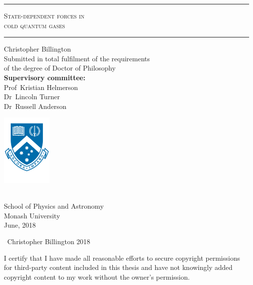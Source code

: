 \begin{titlingpage}
\thispagestyle{empty}
\begin{centering}
\rule{\textwidth}{1pt}\par
\vspace{0.5\baselineskip}
{\HUGE\scshape State-dependent forces in \\ cold quantum gases\\}
\vspace{\baselineskip}
\rule{\textwidth}{1pt}\par
\vfill
{\Huge Christopher Billington}\\
\vfill
\Large Submitted in total fulfilment of the requirements\\
of the degree of Doctor of Philosophy\\
\vspace{\baselineskip}
\textbf{Supervisory committee:}\\
Prof~Kristian Helmerson\\
Dr~Lincoln Turner\\
Dr~Russell Anderson\\
\vfill
\begin{minipage}{3cm}
\centerfloat
\includegraphics[width=2.5cm]{figures/Monash_crest_A4.pdf}
\end{minipage}\\
{\Large School of Physics and Astronomy\\
Monash University\\
\vspace{\baselineskip}
June, 2018}\\
\end{centering}
\restoregeometry
\end{titlingpage}


\cleardoublepage

\vspace*{\fill}

\begin{center}
\begin{minipage}{0.95\textwidth}

\textcopyright\ Christopher Billington 2018 

\vspace{0.5\baselineskip}

I certify that I have made all reasonable efforts to secure copyright permissions for third-party content included in this thesis and have not knowingly added copyright content to my work without the owner's permission.

\end{minipage}
\end{center}

